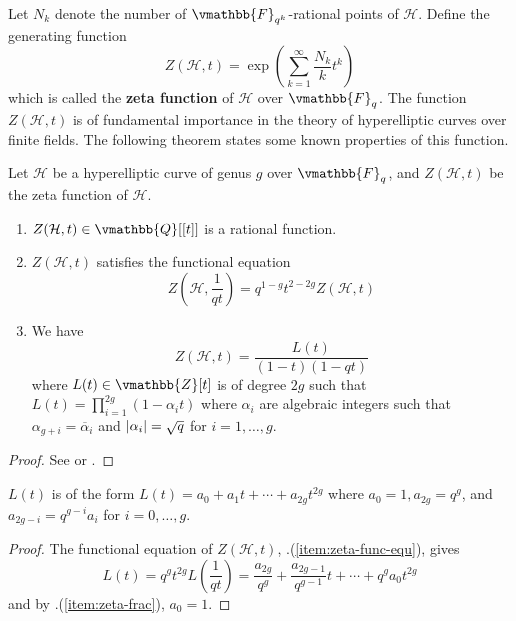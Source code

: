 Let $N_k$ denote the number of $\vmathbb{F}_{q^k}$-rational points of $\mathcal{H}$. Define the 
generating function
\begin{equation}
\label{equation:zeta}
Z(\mathcal{H}, t) = \exp\left( \sum_{k = 1}^\infty \frac{N_k}{k}t^k \right)
\end{equation}
which is called the \textbf{zeta function} of $\mathcal{H}$ over $\vmathbb{F}_q$. The function 
$Z(\mathcal{H}, t)$ is of fundamental importance in the theory of hyperelliptic curves over finite 
fields. The following theorem states some known properties of this function.
\begin{theorem}
\label{theorem:Weil-conj}
Let $\mathcal{H}$ be a hyperelliptic curve of genus $g$ over $\vmathbb{F}_q$, and $Z(\mathcal{H}, t)$ 
be the zeta function of $\mathcal{H}$.
\begin{enumerate}
\item 
$Z(\mathcal{H}, t) \in \vmathbb{Q}[[t]]$ is a rational function.
\item
\label{item:zeta-func-equ}
$Z(\mathcal{H}, t)$ satisfies the functional equation 
$$
Z\left( \mathcal{H}, \frac{1}{qt} \right) = q^{1 - g}t^{2 - 2g}Z(\mathcal{H}, t)
$$
\item
\label{item:zeta-frac}
We have
\begin{equation}
\label{equation:zeta2}
Z(\mathcal{H}, t) = \frac{L(t)}{(1 - t)(1 - qt)}
\end{equation}
where $L(t) \in \vmathbb{Z}[t]$ is of degree $2g$ such that $L(t) = \prod_{i = 1}^{2g} (1 - 
\alpha_it)$ where $\alpha_i$ are algebraic integers such that $\alpha_{g + i} = \overline{\alpha}_i$ 
and $\left\vert\alpha_i\right\vert = \sqrt{q}$ for $i = 1, \dots, g$.
\end{enumerate}
\end{theorem}
\begin{proof}
See \cite[ch. 5]{Stichtenoth2009} or \cite[part ]{vanderGeer1988}.
\end{proof}
\begin{corollary}
\label{corollary:Lfunct-form}
$L(t)$ is of the form $L(t) = a_0 + a_1t + \cdots + a_{2g}t^{2g}$ where $a_0 = 1, a_{2g} = q^g$, and 
$a_{2g - i} = q^{g - i}a_i$ for $i = 0, \dots, g$.
\end{corollary}
\begin{proof}
The functional equation of $Z(\mathcal{H}, t)$, 
.(\ref{item:zeta-func-equ}), gives 
$$
L(t) = q^gt^{2g}L\left( \frac{1}{qt} \right) = \frac{a_{2g}}{q^g} + \frac{a_{2g - 1}}{q^{g - 1}}t + 
\cdots + q^ga_0t^{2g}
$$
and by .(\ref{item:zeta-frac}), $a_0 = 1$.
\end{proof}
